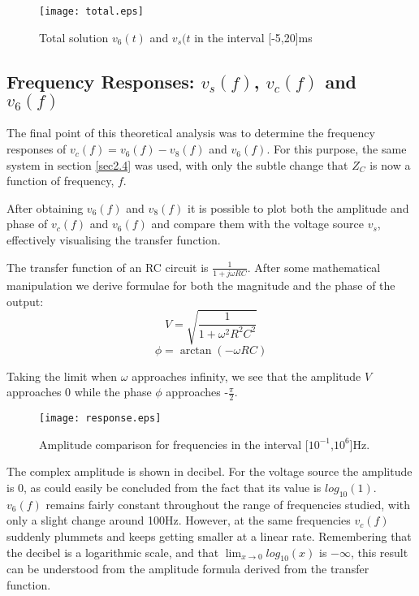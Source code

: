 \begin{figure}[!htp] \centering
\texttt{[image: total.eps]}
\caption{Total solution $v_6(t)$ and $v_s(t$ in the interval [-5,20]ms}
\label{fig4}
\end{figure}
\FloatBarrier

\subsection{Frequency Responses: $v_s(f)$, $v_c(f)$ and $v_6(f)$}\label{sec2.6}

The final point of this theoretical analysis was to determine the frequency responses of $v_c(f) = v_6(f) - v_8(f)$ and $v_6(f)$. For this purpose, the same system in section \ref{sec2.4} was used, with only the subtle change that $Z_C$ is now a function of frequency, $f$.

After obtaining $v_6(f)$ and $v_8(f)$ it is possible to plot both the amplitude and phase of $v_c(f)$ and $v_6(f)$ and compare them with the voltage source $v_s$, effectively visualising the transfer function.

The transfer function of an RC circuit is $\frac{1}{1+j\omega RC}$. After some mathematical manipulation we derive formulae for both the magnitude and the phase of the output:
\begin{equation}
    V = \sqrt{\frac{1}{1+\omega ^2 R^2C^2}}
\end{equation}
\begin{equation}
    \phi = \arctan(-\omega RC)
\end{equation}

Taking the limit when $\omega$ approaches infinity, we see that the amplitude $V$ approaches 0 while the phase $\phi$ approaches -$\frac{\pi}{2}$.

\begin{figure}[!htp] \centering
\texttt{[image: response.eps]}
\caption{Amplitude comparison for frequencies in the interval [$10^{-1}$,$10^6$]Hz.}
\label{fig5}
\end{figure}
\FloatBarrier

The complex amplitude is shown in decibel. For the voltage source the amplitude is 0, as could easily be concluded from the fact that its value is $log_{10}(1)$. $v_6(f)$ remains fairly constant throughout the range of frequencies studied, with only a slight change around 100Hz. However, at the same frequencies $v_c(f)$ suddenly plummets and keeps getting smaller at a linear rate. Remembering that the decibel is a logarithmic scale, and that $\lim_{x\to 0} log_{10}(x)$ is $-\infty$, this result can be understood from the amplitude formula derived from the transfer function.

